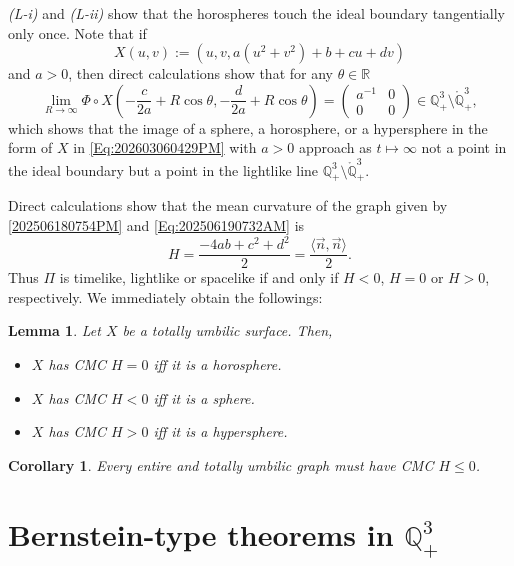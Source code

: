 \documentclass[12pt,reqno]{amsart}
\theoremstyle{plain} %
\newtheorem{lemma}[theorem]{Lemma}
\newtheorem{corollary}[theorem]{Corollary}
\theoremstyle{definition}
\numberwithin{equation}{section}
\newcommand{\qthreep}{\mathbb{Q}^3_+}
\newcommand{\qthreept}{\mathring{\mathbb{Q}}^3_+}
\newcommand{\h}{H}%
\begin{document}
\textit{(L-i)} and \textit{(L-ii)} show that the horospheres touch the ideal boundary tangentially only once.
Note that if
\begin{equation}\label{Eq:202603060429PM}
	X(u,v) := \left( u,v, a(u^2+v^2) + b + cu + dv \right)
\end{equation}
and  $a>0$,
then direct calculations show that for any $\theta \in \mathbb{R}$
$$
	\lim_{R \to \infty} \Phi \circ X \left( - \frac{c}{2a}+R\cos\theta, - \frac{d}{2a}+R\cos\theta \right)
	= \begin{pmatrix} a^{-1} & 0 \\ 0 & 0 \end{pmatrix}
	\in \qthreep\setminus\qthreept,
$$
which shows that the image of a sphere, a horosphere, or a hypersphere in the form of $X$ in \eqref{Eq:202603060429PM} with $a>0$ approach
as $t \mapsto \infty$ not a point in the ideal boundary but a point in the lightlike line $\qthreep\setminus\qthreept$.

Direct calculations show that the mean curvature of  the graph  given by \eqref{202506180754PM} and \eqref{Eq:202506190732AM} is
\begin{equation}\label{Eq:202506190735AM}
	H
	= \frac{-4ab+c^2+d^2}{2}
	= \frac{ \langle \vec{n}, \vec{n} \rangle }{2}.
\end{equation}
Thus $\Pi$ is timelike, lightlike or spacelike if and only if $H<0$, $H=0$ or $H>0$, respectively.
We immediately obtain the followings:
\begin{lemma}
	Let $X$ be a totally umbilic surface. Then,
	\begin{itemize}
		\item  $X$ has CMC $\h=0$ iff it is a horosphere.
		\item  $X$ has CMC $\h<0$ iff it is a sphere.
		\item  $X$ has CMC $\h>0$ iff it is a hypersphere.
	\end{itemize}
\end{lemma}

\begin{corollary}\label{lemma:converse}
	Every entire and totally umbilic graph must  have CMC $\h \le 0$.
\end{corollary}

\section{Bernstein-type theorems in $\mathbb{Q}^3_+$}
\end{document}
